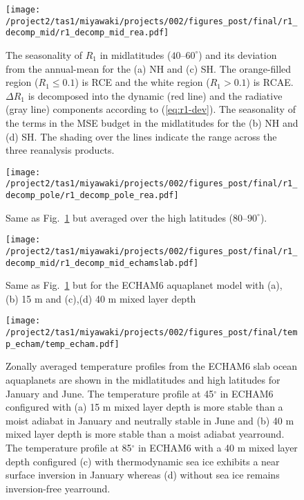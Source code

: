 \documentclass{ametsocV5}
\begin{document}
\begin{figure}[t]
  \noindent\texttt{[image: /project2/tas1/miyawaki/projects/002/figures\_post/final/r1\_decomp\_mid/r1\_decomp\_mid\_rea.pdf]}\\
  \caption{The seasonality of $R_{1}$ in midlatitudes ($40$--$60^{\circ}$) and its deviation from the annual-mean for the (a) NH and (c) SH. The orange-filled region ($R_1 \le 0.1$) is RCE and the white region ($R_1>0.1$) is RCAE. $\Delta R_1$ is decomposed into the dynamic (red line) and the radiative (gray line) components according to (\ref{eq:r1-dev}). The seasonality of the terms in the MSE budget in the midlatitudes for the (b) NH and (d) SH. The shading over the lines indicate the range across the three reanalysis products.}
  \label{fig:rea-r1-decomp-mid}
\end{figure}

\begin{figure}[t]
  \noindent\texttt{[image: /project2/tas1/miyawaki/projects/002/figures\_post/final/r1\_decomp\_pole/r1\_decomp\_pole\_rea.pdf]}\\
  \caption{Same as Fig.~\ref{fig:rea-r1-decomp-mid} but averaged over the high latitudes ($80$--$90^{\circ}$).}
  \label{fig:rea-r1-decomp-pole}
\end{figure}

\begin{figure}[t]
    \noindent\texttt{[image: /project2/tas1/miyawaki/projects/002/figures\_post/final/r1\_decomp\_mid/r1\_decomp\_mid\_echamslab.pdf]}\\
    \caption{Same as Fig.~\ref{fig:rea-r1-decomp-mid} but for the ECHAM6 aquaplanet model with (a), (b) 15 m and (c),(d) 40 m mixed layer depth}
\label{fig:echam-rce}
\end{figure}

\begin{figure}
    \texttt{[image: /project2/tas1/miyawaki/projects/002/figures\_post/final/temp\_echam/temp\_echam.pdf]}
    \caption{Zonally averaged temperature profiles from the ECHAM6 slab ocean aquaplanets are shown in the midlatitudes and high latitudes for January and June. The temperature profile at 45$^\circ$ in ECHAM6 configured with (a) 15 m mixed layer depth is more stable than a moist adiabat in January and neutrally stable in June and (b) 40 m mixed layer depth is more stable than a moist adiabat yearround. The temperature profile at 85$^\circ$ in ECHAM6 with a 40 m mixed layer depth configured (c) with thermodynamic sea ice exhibits a near surface inversion in January whereas (d) without sea ice remains inversion-free yearround.}
    \label{fig:temp-echam}
\end{figure}
\end{document}
